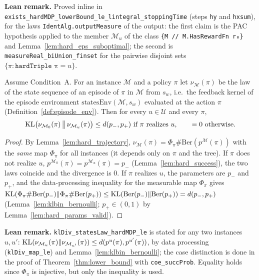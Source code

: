 \textbf{Lean remark.} Proved inline in \texttt{exists\_hardMDP\_lowerBound\_le\_lintegral\_stoppingTime}
(steps \texttt{hy} and \texttt{hxsum}), for the laws \texttt{IdentAlg.outputMeasure} of the output: the
first claim is the PAC hypothesis applied to the member $\mathcal M_u$ of the class
\texttt{\{M // M.HasRewardFn r₀\}} and Lemma~\ref{lem:hard_eps_suboptimal}; the second is
\texttt{measureReal\_biUnion\_finset} for the pairwise disjoint sets $\{\pi : \texttt{hardTriple π} = u\}$.

\begin{lemma}\label{lem:hard_kl_episode}
\leanok
Assume Condition~A. For an instance $\mathcal M$ and a policy $\pi$ let
$\nu_{\mathcal M}(\pi)$ be the law of the state sequence of an episode of $\pi$ in $\mathcal M$
from $s_w$, i.e.\ the feedback kernel of the episode environment
$\mathrm{statesEnv}(\mathcal M, s_w)$ evaluated at the action $\pi$
(Definition~\ref{def:episode_env}). Then for every $u \in \mathcal U$ and every $\pi$,
\[
  \mathrm{KL}\big(\nu_{\mathcal M_0}(\pi) \,\big\|\, \nu_{\mathcal M_u}(\pi)\big) \le d(p_-, p_+) \text{ if } \pi \text{ realizes } u,
  \qquad = 0 \text{ otherwise.}
\]
\end{lemma}

\begin{proof}
\leanok
{}
By Lemma~\ref{lem:hard_trajectory}, $\nu_{\mathcal M}(\pi) = \Phi_\pi \# \mathrm{Ber}(p^{\mathcal M}(\pi))$
with the \emph{same} map $\Phi_\pi$ for all instances (it depends only on $\pi$ and the tree).
If $\pi$ does not realize $u$, $p^{\mathcal M_0}(\pi) = p^{\mathcal M_u}(\pi) = p_-$
(Lemma~\ref{lem:hard_success}), the two laws coincide and the divergence is $0$. If $\pi$
realizes $u$, the parameters are $p_-$ and $p_+$, and the data-processing inequality for the
measurable map $\Phi_\pi$ gives
$\mathrm{KL}(\Phi_\pi\#\mathrm{Ber}(p_-) \| \Phi_\pi\#\mathrm{Ber}(p_+)) \le \mathrm{KL}(\mathrm{Ber}(p_-)\|\mathrm{Ber}(p_+)) = d(p_-, p_+)$
(Lemma~\ref{lem:klbin_bernoulli}; $p_+ \in (0,1)$ by Lemma~\ref{lem:hard_params_valid}).
\end{proof}

\textbf{Lean remark.} \texttt{klDiv\_statesLaw\_hardMDP\_le} is stated for any two instances $u, u'$:
$\mathrm{KL}(\nu_{\mathcal M_u}(\pi) \| \nu_{\mathcal M_{u'}}(\pi)) \le d(p^{u}(\pi), p^{u'}(\pi))$, by data
processing (\texttt{klDiv\_map\_le}) and Lemma~\ref{lem:klbin_bernoulli}; the case distinction is done in
the proof of Theorem~\ref{thm:lower_bound} with \texttt{coe\_succProb}. Equality holds since $\Phi_\pi$
is injective, but only the inequality is used.

